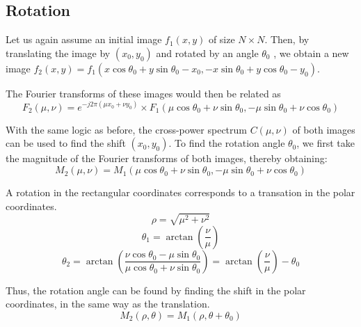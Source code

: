 \documentclass{article}
\begin{document}
\subsection*{Rotation}
Let us again assume an initial image $f_1(x, y)$ of size $N \times N$. Then, by translating the image by $(x_0, y_0)$ and rotated by an angle $\theta_0$
, we obtain a new image $ f_2(x, y) = f_1(x \cos \theta_0 + y \sin \theta_0 - x_0, -x \sin \theta_0 + y \cos \theta_0 - y_0)$. 

The Fourier transforms of these images would then be related as
\[
    F_2(\mu, \nu) = e^{-j 2 \pi (\mu x_0 + \nu y_0)} \times F_1(\mu \cos \theta_0 + \nu \sin \theta_0, -\mu \sin \theta_0 + \nu \cos \theta_0)
\]

With the same logic as before, the cross-power spectrum $C(\mu, \nu)$ of both images can be used to find the shift $(x_0, y_0)$.
\newline
\newline
To find the rotation angle $\theta_0$, we first take the magnitude of the Fourier transforms of both images, thereby obtaining:
\[
    M_2(\mu, \nu) = M_1(\mu \cos \theta_0 + \nu \sin \theta_0, -\mu \sin \theta_0 + \nu \cos \theta_0)
\]

A rotation in the rectangular coordinates corresponds to a transation in the polar coordinates. 
\[
\rho = \sqrt{\mu^2 + \nu^2}
\]
\[
\theta_1 = \arctan\left(\frac{\nu}{\mu}\right)
\]
\[
\theta_2 = \arctan\left(\frac{\nu \cos \theta_0 - \mu \sin \theta_0}{\mu \cos \theta_0 + \nu \sin \theta_0}\right) 
= \arctan\left(\frac{\nu}{\mu}\right) - \theta_0
\]

Thus, the rotation angle can be found by finding the shift in the polar coordinates, in the same way as the translation.
\[
M_2(\rho, \theta) = M_1(\rho, \theta +  \theta_0)
\]
\end{document}

